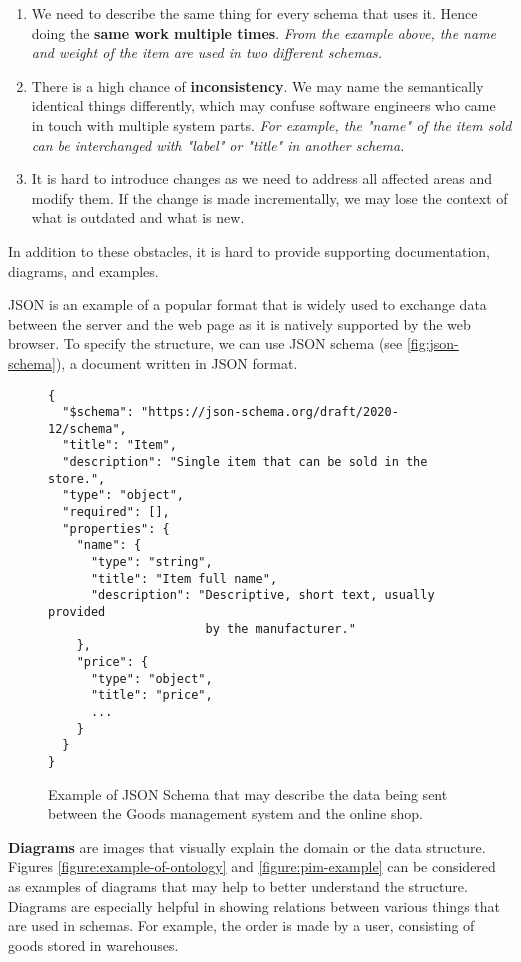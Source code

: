 \begin{enumerate}
    \item We need to describe the same thing for every schema that uses it. Hence doing the \textbf{same work multiple times}. \textit{From the example above, the name and weight of the item are used in two different schemas.}
    \item There is a high chance of \textbf{inconsistency}. We may name the semantically identical things differently, which may confuse software engineers who came in touch with multiple system parts. \textit{For example, the "name" of the item sold can be interchanged with "label" or "title" in another schema.}
    \item It is hard to introduce changes as we need to address all affected areas and modify them. If the change is made incrementally, we may lose the context of what is outdated and what is new.
\end{enumerate}

In addition to these obstacles, it is hard to provide supporting documentation, diagrams, and examples.

\bigskip

JSON is an example of a popular format that is widely used to exchange data between the server and the web page as it is natively supported by the web browser. To specify the structure, we can use JSON schema (see \autoref{fig:json-schema}), a document written in JSON format.

\begin{figure}[h]
\begin{verbatim}
{
  "$schema": "https://json-schema.org/draft/2020-12/schema",
  "title": "Item",
  "description": "Single item that can be sold in the store.",
  "type": "object",
  "required": [],
  "properties": {
    "name": {
      "type": "string",
      "title": "Item full name",
      "description": "Descriptive, short text, usually provided
                      by the manufacturer."
    },
    "price": {
      "type": "object",
      "title": "price",
      ...
    }
  }
}
\end{verbatim}
\caption{Example of JSON Schema that may describe the data being sent between the Goods management system and the online shop.}
\label{fig:json-schema}
\end{figure}

\textbf{Diagrams} are images that visually explain the domain or the data structure. Figures \ref{figure:example-of-ontology} and \ref{figure:pim-example} can be considered as examples of diagrams that may help to better understand the structure. Diagrams are especially helpful in showing relations between various things that are used in schemas. For example, the order is made by a user, consisting of goods stored in warehouses.

